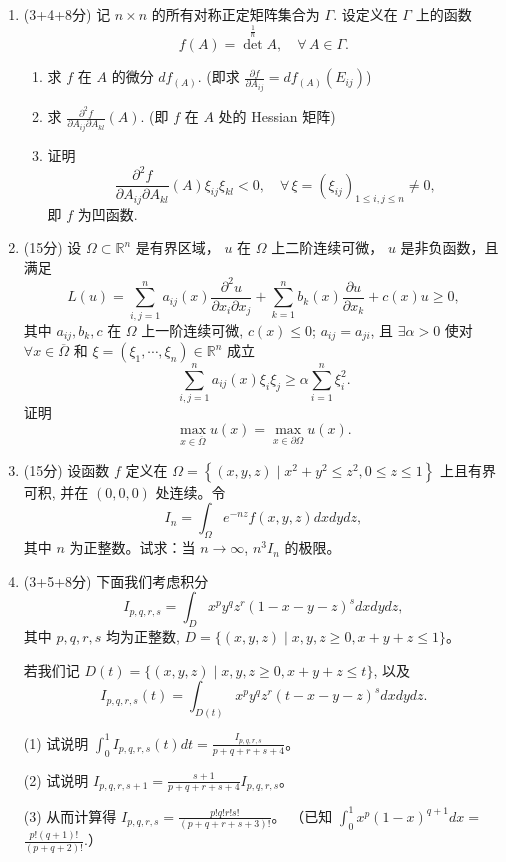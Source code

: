 \begin{enumerate}
\item[四、] (3+4+8分) 记 $n \times n$ 的所有对称正定矩阵集合为 $\Gamma$. 设定义在 $\Gamma$ 上的函数
$$f(A)=\operatorname{det}^{\frac{1}{n}}\!A, \quad \forall\, A \in \Gamma.$$
\begin{enumerate}[label=(\alph*)]
\item 求 $f$ 在 $A$ 的微分 $df_{(A)}$. (即求 $\frac{\partial f}{\partial A_{ij}}=df_{(A)}(E_{ij})$)
\item 求 $\frac{\partial^2 f}{\partial A_{ij} \partial A_{kl}}(A)$. (即 $f$ 在 $A$ 处的 Hessian 矩阵)
\item 证明
$$\frac{\partial^2 f}{\partial A_{ij} \partial A_{kl}}(A) \xi_{ij} \xi_{kl}<0, \quad 
\forall\, \xi=\left(\xi_{ij}\right)_{1 \leq i, j \leq n} \neq 0,$$
即 $f$ 为凹函数.
\end{enumerate}

\item[五、] (15分) 设 $\Omega \subset \mathbb{R}^n$ 是有界区域， 
$u$ 在 $\Omega$ 上二阶连续可微， $u$ 是非负函数，且满足
$$L(u)=\sum_{i, j=1}^n a_{ij}(x) \frac{\partial^2 u}{\partial x_i \partial x_j}+\sum_{k=1}^n b_k(x) \frac{\partial u}{\partial x_k}+c(x) u \geq 0,$$
其中 $a_{ij}, b_k, c$ 在 $\Omega$ 上一阶连续可微, $c(x) \leq 0$; 
$a_{ij}=a_{ji}$, 且 $\exists \alpha> 0$ 使对 $\forall x \in \overline{\Omega}$ 
和 $\xi=(\xi_1, \cdots, \xi_n) \in \mathbb{R}^n$ 成立
$$\sum_{i, j=1}^n a_{ij}(x) \xi_i \xi_j \geq \alpha \sum_{i=1}^n \xi_i^2.$$
证明
$$\max_{x \in \overline{\Omega}} u(x)=\max_{x \in \partial \Omega} u(x).$$

\item[六、] (15分) 设函数 $f$ 定义在 $\Omega=\left\{(x, y, z) \mid x^2+y^2 \leq z^2, 0 \leq z \leq 1\right\}$ 上且有界可积, 并在 $(0,0,0)$ 处连续。令
$$I_n=\int_{\Omega} e^{-nz} f(x, y, z) dx dy dz,$$
其中 $n$ 为正整数。试求：当 $n \rightarrow \infty$, $n^3 I_n$ 的极限。

\item[七、] (3+5+8分) 下面我们考虑积分
$$I_{p, q, r, s}=\int_D x^p y^q z^r(1-x-y-z)^s dx dy dz,$$
其中 $p, q, r, s$ 均为正整数, $D=\{(x, y, z) \mid x, y, z \geq 0, x+y+z \leq 1\}$。

若我们记 $D(t)=\{(x, y, z) \mid x, y, z \geq 0, x+y+z \leq t\}$, 以及
$$I_{p, q, r, s}(t)=\int_{D(t)} x^p y^q z^r(t-x-y-z)^s dx dy dz.$$

(1) 试说明 $\int_0^1 I_{p, q, r, s}(t) dt=\frac{I_{p, q, r, s}}{p+q+r+s+4}$。

(2) 试说明 $I_{p, q, r, s+1}=\frac{s+1}{p+q+r+s+4} I_{p, q, r, s}$。

(3) 从而计算得 $I_{p, q, r, s}=\frac{p!q!r!s!}{(p+q+r+s+3)!}$。
（已知 $\int_0^1 x^p(1-x)^{q+1} dx=$ $\frac{p!(q+1)!}{(p+q+2)!}$.）
\end{enumerate}

